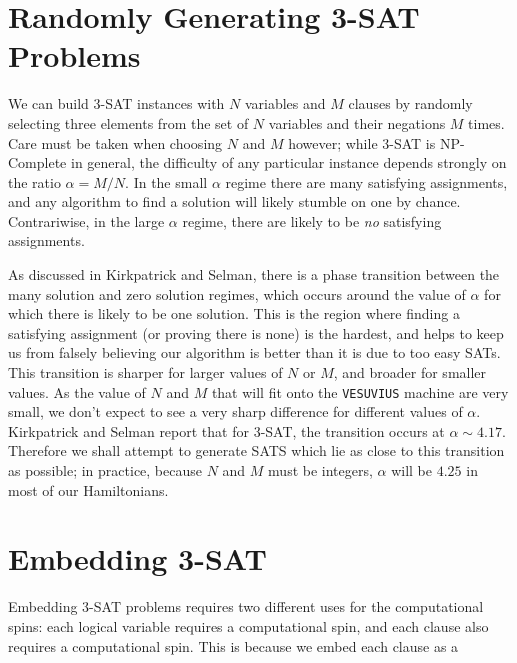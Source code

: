 \section{Randomly Generating 3-SAT Problems}
We can build 3-SAT instances with $N$ variables and $M$ clauses by randomly selecting three elements from the set of $N$ variables and their negations $M$ times.  Care must be taken when choosing $N$ and $M$ however; while 3-SAT is NP-Complete in general, the difficulty of any particular instance depends strongly on the ratio $\alpha = M/N$\cite{Kirkpatrick}.  In the small $\alpha$ regime there are many satisfying assignments, and any algorithm to find a solution will likely stumble on one by chance.  Contrariwise, in the large $\alpha$ regime, there are likely to be \emph{no} satisfying assignments.

As discussed in Kirkpatrick and Selman\cite{Kirkpatrick}, there is a phase transition between the many solution and zero solution regimes, which occurs around the value of $\alpha$ for which there is likely to be one solution.  This is the region where finding a satisfying assignment (or proving there is none) is the hardest, and helps to keep us from falsely believing our algorithm is better than it is due to too easy SATs.  This transition is sharper for larger values of $N$ or $M$, and broader for smaller values.  As the value of $N$ and $M$ that will fit onto the \texttt{VESUVIUS} machine are very small, we don't expect to see a very sharp difference for different values of $\alpha$.  Kirkpatrick and Selman report that for 3-SAT, the transition occurs at $\alpha \sim 4.17$.  Therefore we shall attempt to generate SATS which lie as close to this transition as possible; in practice, because $N$ and $M$ must be integers, $\alpha$ will be $4.25$ in most of our Hamiltonians.

\section{Embedding 3-SAT}
Embedding 3-SAT problems requires two different uses for the computational spins: each logical variable requires a computational spin, and each clause also requires a computational spin.  This is because we embed each clause as a 
